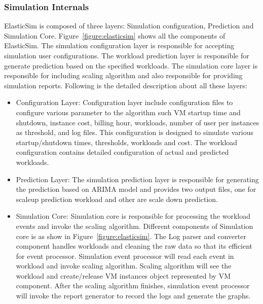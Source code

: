  \subsubsection{Simulation Internals}
 \label{subs:Simulation Internals}
 ElasticSim is composed of three layers: Simulation configuration, Prediction and Simulation Core. Figure~\ref{figure:elasticsim} shows all the components of ElasticSim. The simulation configuration layer is responsible for accepting simulation user configurations. The workload prediction layer is responsible for generate prediction based on the specified workloads. The simulation core layer is responsible for including scaling algorithm and also responsible for providing simulation reports. Following is the detailed description about all these layers:
 \begin{itemize}
 \item Configuration Layer: Configuration layer include configuration files to configure various parameter to the algorithm such VM startup time and shutdown, instance cost, billing hour, workloads, number of user per instances as threshold, and  log files. This configuration is designed to simulate various startup/shutdown times, thresholds, workloads and cost. The workload configuration contains detailed configuration of actual and predicted workloads.
 \item Prediction Layer: The simulation prediction layer is responsible for generating the prediction based on ARIMA model and provides two output files, one for scaleup prediction workload and other are scale down prediction.
 \item Simulation Core: Simulation core is responsible for processing the workload events and invoke the scaling algorithm.
 Different components of Simulation core is as show in Figure~\ref{figure:elasticsim}. The Log parser and converter component handles workloads and cleaning the raw data so that its efficient for event processor. Simulation event processor will read each event in workload and invoke scaling algorithm. Scaling algorithm will see the workload and create/release VM instances object represented by VM component. After the scaling algorithm finishes, simulation event processor will invoke the report generator to record the logs and generate the graphs.
 \end{itemize}

